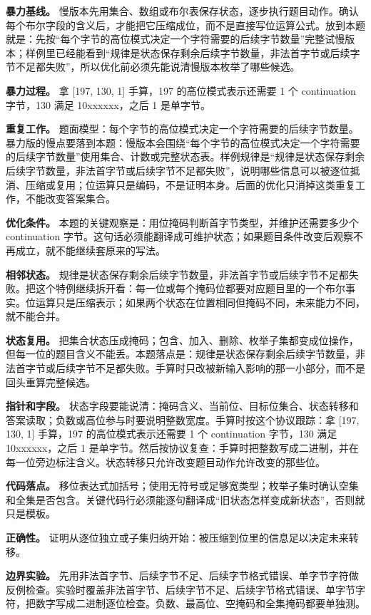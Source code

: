\textbf{暴力基线。} 慢版本先用集合、数组或布尔表保存状态，逐步执行题目动作。确认每个布尔字段的含义后，才能把它压缩成位，而不是直接写位运算公式。放到本题就是：先按“每个字节的高位模式决定一个字符需要的后续字节数量”完整试慢版本；样例里已经能看到“规律是状态保存剩余后续字节数量，非法首字节或后续字节不足都失败”，所以优化前必须先能说清慢版本枚举了哪些候选。

\textbf{暴力过程。} 拿 [197, 130, 1] 手算，197 的高位模式表示还需要 1 个 continuation 字节，130 满足 10xxxxxx，之后 1 是单字节。

\textbf{重复工作。} 题面模型：每个字节的高位模式决定一个字符需要的后续字节数量。暴力版的慢点要落到本题：慢版本会围绕“每个字节的高位模式决定一个字符需要的后续字节数量”使用集合、计数或完整状态表。样例规律是“规律是状态保存剩余后续字节数量，非法首字节或后续字节不足都失败”，说明哪些信息可以被逐位抵消、压缩或复用；位运算只是编码，不是证明本身。后面的优化只消掉这类重复工作，不能改变答案集合。

\textbf{优化条件。} 本题的关键观察是：用位掩码判断首字节类型，并维护还需要多少个 continuation 字节。这句话必须能翻译成可维护状态；如果题目条件改变后观察不再成立，就不能继续套原来的写法。

\textbf{相邻状态。} 规律是状态保存剩余后续字节数量，非法首字节或后续字节不足都失败。把这个特例继续拆开看：每一位或每个掩码位都要对应题目里的一个布尔事实。位运算只是压缩表示；如果两个状态在位置相同但掩码不同，未来能力不同，就不能合并。

\textbf{状态复用。} 把集合状态压成掩码；包含、加入、删除、枚举子集都变成位操作，但每一位的题目含义不能丢。本题落点是：规律是状态保存剩余后续字节数量，非法首字节或后续字节不足都失败。手算时只改被新输入影响的那一小部分，而不是回头重算完整候选。

\textbf{指针和字段。} 状态字段要能说清：掩码含义、当前位、目标位集合、状态转移和答案读取；负数或高位参与时要说明整数宽度。手算时按这个协议跟踪：拿 [197, 130, 1] 手算，197 的高位模式表示还需要 1 个 continuation 字节，130 满足 10xxxxxx，之后 1 是单字节。然后按协议复查：手算时把整数写成二进制，并在每一位旁边标注含义。状态转移只允许改变题目动作允许改变的那些位。

\textbf{代码落点。} 移位表达式加括号；使用无符号或足够宽类型；枚举子集时确认空集和全集是否包含。关键代码行必须能逐句翻译成“旧状态怎样变成新状态”，否则就只是模板。

\textbf{正确性。} 证明从逐位独立或子集归纳开始：被压缩到位里的信息足以决定未来转移。

\textbf{边界实验。} 先用非法首字节、后续字节不足、后续字节格式错误、单字节字符做反例检查。实验时覆盖非法首字节、后续字节不足、后续字节格式错误、单字节字符，把数字写成二进制逐位检查。负数、最高位、空掩码和全集掩码都要单独测。

